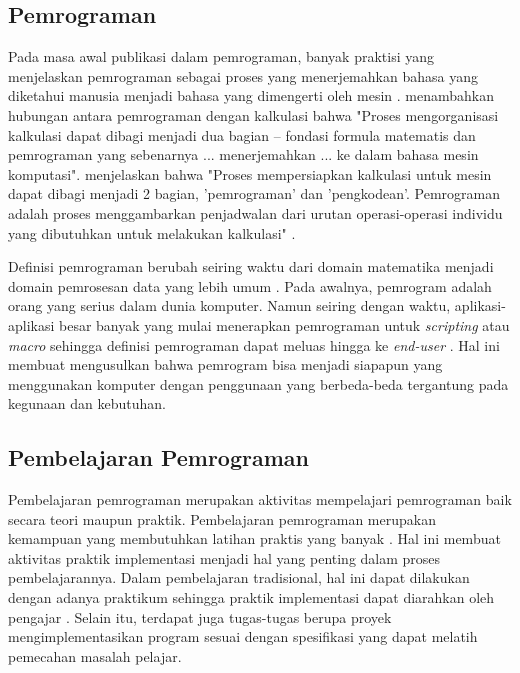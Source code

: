 \subsection{Pemrograman}
Pada masa awal publikasi dalam pemrograman, banyak praktisi yang menjelaskan pemrograman sebagai proses yang menerjemahkan bahasa yang diketahui manusia menjadi bahasa yang dimengerti oleh mesin \parencite{mccracken1957digital}. \textcite{booth1958programming} menambahkan hubungan antara pemrograman dengan kalkulasi bahwa "Proses mengorganisasi kalkulasi dapat dibagi menjadi dua bagian -- fondasi formula matematis dan pemrograman yang sebenarnya ... menerjemahkan ... ke dalam bahasa mesin komputasi". \textcite{hartree2012calculating} menjelaskan bahwa "Proses mempersiapkan kalkulasi untuk mesin dapat dibagi menjadi 2 bagian, 'pemrograman' dan 'pengkodean'. Pemrograman adalah proses menggambarkan penjadwalan dari urutan operasi-operasi individu yang dibutuhkan untuk melakukan kalkulasi" \parencite{hartree2012calculating}.

Definisi pemrograman berubah seiring waktu dari domain matematika menjadi domain pemrosesan data yang lebih umum \parencite{hoc1990psychology}. Pada awalnya, pemrogram adalah orang yang serius dalam dunia komputer. Namun seiring dengan waktu, aplikasi-aplikasi besar banyak yang mulai menerapkan pemrograman untuk \textit{scripting} atau \textit{macro} sehingga definisi pemrograman dapat meluas hingga ke \textit{end-user} \parencite{goodell1999enduser}. Hal ini membuat \textcite{blackwell2002programming} mengusulkan bahwa pemrogram bisa menjadi siapapun yang menggunakan komputer dengan penggunaan yang berbeda-beda tergantung pada kegunaan dan kebutuhan.

\subsection{Pembelajaran Pemrograman}
Pembelajaran pemrograman merupakan aktivitas mempelajari pemrograman baik secara teori maupun praktik. Pembelajaran pemrograman merupakan kemampuan yang membutuhkan latihan praktis yang banyak \parencite{thomas2000student}. Hal ini membuat aktivitas praktik implementasi menjadi hal yang penting dalam proses pembelajarannya. Dalam pembelajaran tradisional, hal ini dapat dilakukan dengan adanya praktikum sehingga praktik implementasi dapat diarahkan oleh pengajar \parencite{choy2004interactive}. Selain itu, terdapat juga tugas-tugas berupa proyek mengimplementasikan program sesuai dengan spesifikasi yang dapat melatih pemecahan masalah pelajar.

